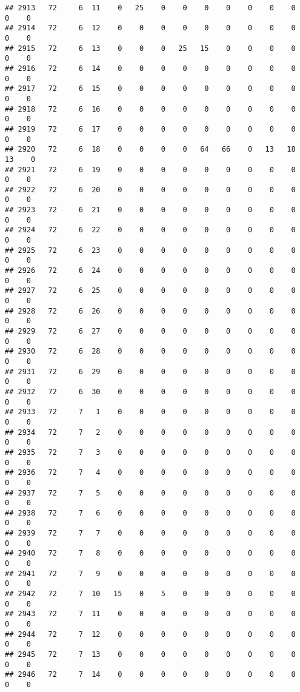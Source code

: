 \documentclass[]{article}
\begin{document}
\begin{verbatim}
## 2913   72     6  11    0   25    0    0    0    0    0    0    0    0    0
## 2914   72     6  12    0    0    0    0    0    0    0    0    0    0    0
## 2915   72     6  13    0    0    0   25   15    0    0    0    0    0    0
## 2916   72     6  14    0    0    0    0    0    0    0    0    0    0    0
## 2917   72     6  15    0    0    0    0    0    0    0    0    0    0    0
## 2918   72     6  16    0    0    0    0    0    0    0    0    0    0    0
## 2919   72     6  17    0    0    0    0    0    0    0    0    0    0    0
## 2920   72     6  18    0    0    0    0   64   66    0   13   18   13    0
## 2921   72     6  19    0    0    0    0    0    0    0    0    0    0    0
## 2922   72     6  20    0    0    0    0    0    0    0    0    0    0    0
## 2923   72     6  21    0    0    0    0    0    0    0    0    0    0    0
## 2924   72     6  22    0    0    0    0    0    0    0    0    0    0    0
## 2925   72     6  23    0    0    0    0    0    0    0    0    0    0    0
## 2926   72     6  24    0    0    0    0    0    0    0    0    0    0    0
## 2927   72     6  25    0    0    0    0    0    0    0    0    0    0    0
## 2928   72     6  26    0    0    0    0    0    0    0    0    0    0    0
## 2929   72     6  27    0    0    0    0    0    0    0    0    0    0    0
## 2930   72     6  28    0    0    0    0    0    0    0    0    0    0    0
## 2931   72     6  29    0    0    0    0    0    0    0    0    0    0    0
## 2932   72     6  30    0    0    0    0    0    0    0    0    0    0    0
## 2933   72     7   1    0    0    0    0    0    0    0    0    0    0    0
## 2934   72     7   2    0    0    0    0    0    0    0    0    0    0    0
## 2935   72     7   3    0    0    0    0    0    0    0    0    0    0    0
## 2936   72     7   4    0    0    0    0    0    0    0    0    0    0    0
## 2937   72     7   5    0    0    0    0    0    0    0    0    0    0    0
## 2938   72     7   6    0    0    0    0    0    0    0    0    0    0    0
## 2939   72     7   7    0    0    0    0    0    0    0    0    0    0    0
## 2940   72     7   8    0    0    0    0    0    0    0    0    0    0    0
## 2941   72     7   9    0    0    0    0    0    0    0    0    0    0    0
## 2942   72     7  10   15    0    5    0    0    0    0    0    0    0    0
## 2943   72     7  11    0    0    0    0    0    0    0    0    0    0    0
## 2944   72     7  12    0    0    0    0    0    0    0    0    0    0    0
## 2945   72     7  13    0    0    0    0    0    0    0    0    0    0    0
## 2946   72     7  14    0    0    0    0    0    0    0    0    0    0    0

\end{verbatim}
\end{document}
